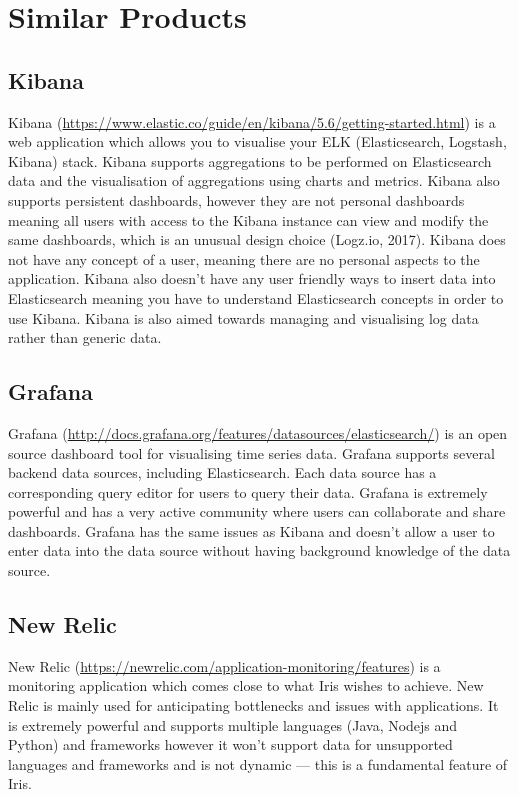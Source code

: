 \documentclass[12pt,a4paper,titlepage]{report}
\begin{document}
\section{Similar Products}
\subsection{Kibana}

Kibana (\url{https://www.elastic.co/guide/en/kibana/5.6/getting-started.html}) is a web application which allows you to visualise your ELK (Elasticsearch, Logstash, Kibana) stack. Kibana supports aggregations to be performed on Elasticsearch data and the visualisation of aggregations using charts and metrics. Kibana also supports persistent dashboards, however they are not personal dashboards meaning all users with access to the Kibana instance can view and modify the same dashboards, which is an unusual design choice (Logz.io, 2017). Kibana does not have any concept of a user, meaning there are no personal aspects to the application. Kibana also doesn’t have any user friendly ways to insert data into Elasticsearch meaning you have to understand Elasticsearch concepts in order to use Kibana. Kibana is also aimed towards managing and visualising log data rather than generic data. 

\subsection{Grafana}

Grafana (\url{http://docs.grafana.org/features/datasources/elasticsearch/}) is an open source dashboard tool for visualising time series data. Grafana supports several backend data sources, including Elasticsearch. Each data source has a corresponding query editor for users to query their data. Grafana is extremely powerful and has a very active community where users can collaborate and share dashboards. Grafana has the same issues as Kibana and doesn’t allow a user to enter data into the data source without having background knowledge of the data source.

\subsection{New Relic}

New Relic (\url{https://newrelic.com/application-monitoring/features}) is a monitoring application which comes close to what Iris wishes to achieve. New Relic is mainly used for anticipating bottlenecks and issues with applications. It is extremely powerful and supports multiple languages (Java, Nodejs and Python) and frameworks however it won’t support data for unsupported languages and frameworks and is not dynamic — this is a fundamental feature of Iris.
\end{document}
